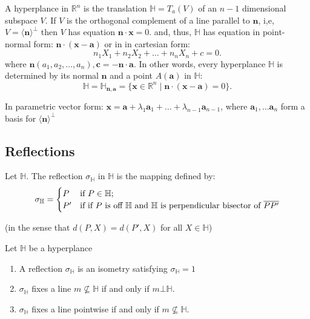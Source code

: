 \begin{definition}
  A hyperplance in \( \mathbb{R}^{n} \) is the translation \(\mathbb{H} = T_{a}(V)\) of an \( n-1 \) dimensional subspace \( V \).
  If \( V \) is the orthogonal complement of a line parallel to \( \mathbf{n} \), i,e, \( V = \langle \mathbf{n}\rangle^{\bot} \) then \( V \) has equation \( \mathbf{n} \cdot \mathbf{x} = 0 \).
  and, thus, \( \mathbb{H} \) has equation in point-normal form: \( \mathbf{n} \cdot \left(\mathbf{x} - \mathbf{a}  \right)\) or in
  in cartesian form:
  \[
    n_{1}X_{1} + n_{2}X_{2} + \ldots + n_{n}X_{n} + c = 0
  .\] 
  where \( \mathbf{n}  \left( a_{1}, a_{2}, \ldots , a_{n} \right), \mathbf{c} = - \mathbf{n} \cdot \mathbf{a}\). In other words, every 
  hyperplance \( \mathbb{H} \) is determined by its normal \( \mathbf{n} \) and a point \( A(\mathbf{a}) \) in \( \mathbb{H} \):
  \[
    \mathbb{H} = \mathbb{H}_{\mathbf{n}, \mathbf{a}} = \{\mathbf{x} \in \mathbb{R}^{n} \mid  \mathbf{n} \cdot(\mathbf{x} - \mathbf{a}) = 0\}
  .\] 

  In parametric vector form: \( \mathbf{x} = \mathbf{a} + \lambda_1\mathbf{a}_1 + \ldots + \lambda_{n-1} \mathbf{a}_{n-1} \), where
  \( \mathbf{a}_1, \ldots \mathbf{a}_n \) form a basis for \( \langle \mathbf{n} \rangle^{\bot} \)
\end{definition}

\subsection{Reflections} 
\begin{definition}
  Let \( \mathbb{H} \). The reflection \( \sigma _{\mathbb{H} } \) in \( \mathbb{H} \) is the mapping defined by:
\begin{equation*}
\sigma_{\mathbb{H}} =
    \begin{cases}
      P   & \text{if  \( P \in \mathbb{H}; \)}  \\
       P'  & \text{if if \( P  \) is off \( \mathbb{H} \) and \( \mathbb{H} \) is perpendicular bisector of \( \overline{PP'} \)} 
    \end{cases}
\end{equation*}

(in the sense that \( d(P, X) = d \left( P', X \right) \) for all \( X \in \mathbb{H}\)) 
\end{definition}

\begin{proposition}
 Let \( \mathbb{H} \)  be a hyperplance
 \begin{enumerate}
   \item A reflection \( \sigma_{\mathbb{H}} \) is an isometry satisfying \( \sigma_{\mathbb{H}} = 1\)
    \item \( \sigma_{\mathbb{H}} \) fixes a line \( m \not \subseteq \mathbb{H} \) if and only if \( m \bot \mathbb{H} \).
    \item \( \sigma_{\mathbb{H}} \) fixes a line pointwise if and only if \( m \not \subseteq \mathbb{H} \).
 \end{enumerate}

\end{proposition}

